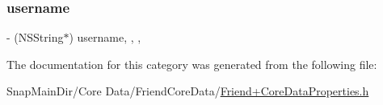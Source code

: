 \subsubsection{\texorpdfstring{username}{username}}
{\footnotesize\ttfamily -\/ (N\+S\+String$\ast$) username\hspace{0.3cm}{\ttfamily [read]}, {\ttfamily [write]}, {\ttfamily [nonatomic]}, {\ttfamily [retain]}}



The documentation for this category was generated from the following file\+:\begin{DoxyCompactItemize}
\item 
Snap\+Main\+Dir/\+Core Data/\+Friend\+Core\+Data/\hyperlink{_friend_09_core_data_properties_8h}{Friend+\+Core\+Data\+Properties.\+h}\end{DoxyCompactItemize}
